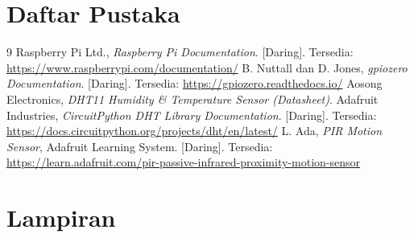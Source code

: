 \documentclass[12pt, a4paper]{article}
\begin{document}
\section*{Daftar Pustaka}
\begin{thebibliography}{9}
 Raspberry Pi Ltd., \textit{Raspberry Pi Documentation}. [Daring]. Tersedia: \url{https://www.raspberrypi.com/documentation/}
 B. Nuttall dan D. Jones, \textit{gpiozero Documentation}. [Daring]. Tersedia: \url{https://gpiozero.readthedocs.io/}
 Aosong Electronics, \textit{DHT11 Humidity \& Temperature Sensor (Datasheet)}.
 Adafruit Industries, \textit{CircuitPython DHT Library Documentation}. [Daring]. Tersedia: \url{https://docs.circuitpython.org/projects/dht/en/latest/}
 L. Ada, \textit{PIR Motion Sensor}, Adafruit Learning System. [Daring]. Tersedia: \url{https://learn.adafruit.com/pir-passive-infrared-proximity-motion-sensor}
\end{thebibliography}

\newpage
\section*{Lampiran}
\end{document}
